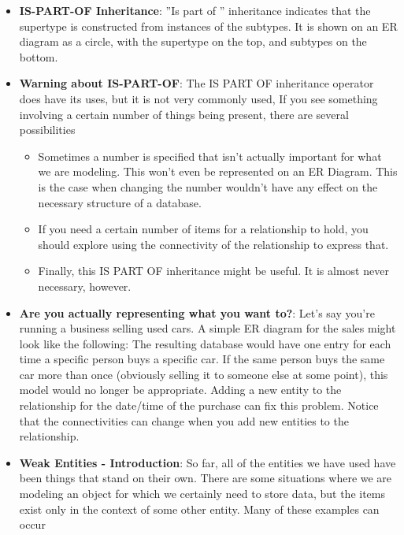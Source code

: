 \documentclass{report}
\begin{document}
\begin{itemize}
        \item \textbf{IS-PART-OF Inheritance}: ”Is part of ” inheritance indicates that the
supertype is constructed from instances of the
subtypes. It is shown on an ER diagram as a circle,
with the supertype on the top, and subtypes on
the bottom.
\bigbreak \noindent 
{}
    \item \textbf{Warning about IS-PART-OF}:  The IS PART OF inheritance operator does have its uses, but it is not very commonly used, If you see something involving a certain number of things being present, there are several possibilities
        \begin{itemize}
            \item Sometimes a number is specified that isn’t actually important for what we are modeling. This won’t even be represented on an ER Diagram. This is the case when changing the number wouldn’t have any effect on the necessary structure of a database.
            \item If you need a certain number of items for a relationship to hold, you should explore using the connectivity of the relationship to express that.
            \item Finally, this IS PART OF inheritance might be useful. It is almost never necessary, however.
        \end{itemize}
    \item \textbf{Are you actually representing what you want to?}: Let’s say you’re running a business selling used cars. A simple ER diagram for the sales might look like the following:
        \bigbreak \noindent 
        \bigbreak \noindent 
        The resulting database would have one entry for each time a specific person buys a specific car. If the same person
buys the same car more than once (obviously selling it to someone else at some point), this model would no longer
be appropriate.
\bigbreak \noindent 
Adding a new entity to the relationship for the date/time of the purchase can fix this problem.
\bigbreak \noindent 
{}
\bigbreak \noindent 
Notice that the connectivities can change when you add new entities to the relationship.
\item \textbf{Weak Entities - Introduction}: So far, all of the entities we have used have been things that stand on their own. There are some situations where
we are modeling an object for which we certainly need to store data, but the items exist only in the context of some
other entity. Many of these examples can occur

\end{itemize}
\end{document}

